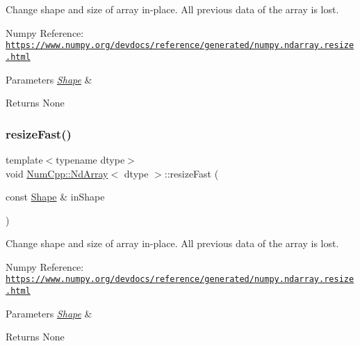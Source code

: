 Change shape and size of array in-\/place. All previous data of the array is lost.

Numpy Reference\+: \href{https://www.numpy.org/devdocs/reference/generated/numpy.ndarray.resize.html}{\tt https\+://www.\+numpy.\+org/devdocs/reference/generated/numpy.\+ndarray.\+resize.\+html}


\begin{DoxyParams}{Parameters}
{\em \mbox{\hyperlink{class_num_cpp_1_1_shape}{Shape}}} & \\
\hline
\end{DoxyParams}
\begin{DoxyReturn}{Returns}
None 
\end{DoxyReturn}
\mbox{\label{class_num_cpp_1_1_nd_array_a2dcd826fd54aa63a56018a7d03b57fe0}} 
\subsubsection{\texorpdfstring{resize\+Fast()}{resizeFast()}\hspace{0.1cm}{\footnotesize\ttfamily [2/2]}}
{\footnotesize\ttfamily template$<$typename dtype$>$ \\
void \mbox{\hyperlink{class_num_cpp_1_1_nd_array}{Num\+Cpp\+::\+Nd\+Array}}$<$ dtype $>$\+::resize\+Fast (\begin{DoxyParamCaption}\item[{const \mbox{\hyperlink{class_num_cpp_1_1_shape}{Shape}} \&}]{in\+Shape }\end{DoxyParamCaption})\hspace{0.3cm}{\ttfamily [inline]}}

Change shape and size of array in-\/place. All previous data of the array is lost.

Numpy Reference\+: \href{https://www.numpy.org/devdocs/reference/generated/numpy.ndarray.resize.html}{\tt https\+://www.\+numpy.\+org/devdocs/reference/generated/numpy.\+ndarray.\+resize.\+html}


\begin{DoxyParams}{Parameters}
{\em \mbox{\hyperlink{class_num_cpp_1_1_shape}{Shape}}} & \\
\hline
\end{DoxyParams}
\begin{DoxyReturn}{Returns}
None 
\end{DoxyReturn}
\mbox{\label{class_num_cpp_1_1_nd_array_a9afb7dbd9ef7b1bb636fbf465fe2077d}} 
